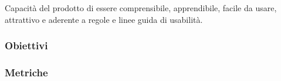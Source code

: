 Capacità del prodotto di essere comprensibile, apprendibile, facile da usare, 
attrattivo e aderente a regole e linee guida di usabilità.

\subsubsection{Obiettivi}


\subsubsection{Metriche}
